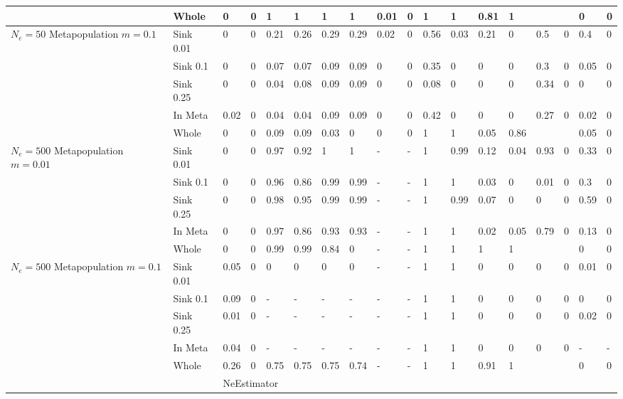 \begin{landscape}
\begin{table}[h]
\begin{tabular}{ | l| l|| l| l| l| l| l| l| l| l| l| l| l| l| l| l| l| l| }
  & Whole & 0 & 0 & 1 & 1 & 1 & 1 & 0.01 & 0 & 1 & 1 & 0.81 & 1 &  &  & 0 & 0  \\ \hline
\multirow{5}{1cm}{$N_e = 50$ Metapopulation $m = 0.1$} & Sink 0.01 & 0 & 0 & 0.21 & 0.26 & 0.29 & 0.29 & 0.02 & 0 & 0.56 & 0.03 & 0.21 & 0 & 0.5 & 0 & 0.4 & 0  \\ \cline{2-18}
  & Sink 0.1 & 0 & 0 & 0.07 & 0.07 & 0.09 & 0.09 & 0 & 0 & 0.35 & 0 & 0 & 0 & 0.3 & 0 & 0.05 & 0  \\ \cline{2-18}
  & Sink 0.25 & 0 & 0 & 0.04 & 0.08 & 0.09 & 0.09 & 0 & 0 & 0.08 & 0 & 0 & 0 & 0.34 & 0 & 0 & 0  \\ \cline{2-18}
  & In Meta & 0.02 & 0 & 0.04 & 0.04 & 0.09 & 0.09 & 0 & 0 & 0.42 & 0 & 0 & 0 & 0.27 & 0 & 0.02 & 0  \\ \cline{2-18}
  & Whole & 0 & 0 & 0.09 & 0.09 & 0.03 & 0 & 0 & 0 & 1 & 1 & 0.05 & 0.86 &  &  & 0.05 & 0  \\ \hline
\multirow{5}{1cm}{$N_e = 500$ Metapopulation $m = 0.01$} & Sink 0.01 & 0 & 0 & 0.97 & 0.92 & 1 & 1 & - & - & 1 & 0.99 & 0.12 & 0.04 & 0.93 & 0 & 0.33 & 0  \\ \cline{2-18}
  & Sink 0.1 & 0 & 0 & 0.96 & 0.86 & 0.99 & 0.99 & - & - & 1 & 1 & 0.03 & 0 & 0.01 & 0 & 0.3 & 0  \\ \cline{2-18}
  & Sink 0.25 & 0 & 0 & 0.98 & 0.95 & 0.99 & 0.99 & - & - & 1 & 0.99 & 0.07 & 0 & 0 & 0 & 0.59 & 0  \\ \cline{2-18}
  & In Meta & 0 & 0 & 0.97 & 0.86 & 0.93 & 0.93 & - & - & 1 & 1 & 0.02 & 0.05 & 0.79 & 0 & 0.13 & 0  \\ \cline{2-18}
  & Whole & 0 & 0 & 0.99 & 0.99 & 0.84 & 0 & - & - & 1 & 1 & 1 & 1 &  &  & 0 & 0  \\ \hline
\multirow{5}{1cm}{$N_e = 500$ Metapopulation $m = 0.1$} & Sink 0.01 & 0.05 & 0 & 0 & 0 & 0 & 0 & - & - & 1 & 1 & 0 & 0 & 0 & 0 & 0.01 & 0  \\ \cline{2-18}
  & Sink 0.1 & 0.09 & 0 & - & - & - & - & - & - & 1 & 1 & 0 & 0 & 0 & 0 & 0 & 0  \\ \cline{2-18}
  & Sink 0.25 & 0.01 & 0 & - & - & - & - & - & - & 1 & 1 & 0 & 0 & 0 & 0 & 0.02 & 0  \\ \cline{2-18}
  & In Meta & 0.04 & 0 & - & - & - & - & - & - & 1 & 1 & 0 & 0 & 0 & 0 & - & -  \\ \cline{2-18}
  & Whole & 0.26 & 0 & 0.75 & 0.75 & 0.75 & 0.74 & - & - & 1 & 1 & 0.91 & 1 &  &  & 0 & 0  \\ \hline \cline{1-14}
\multicolumn{2}{l}{} & \multicolumn{12}{l}{NeEstimator} & \multicolumn{4}{l}{} \\ \cline{1-14}

\end{tabular}
\end{table}
\end{landscape}
